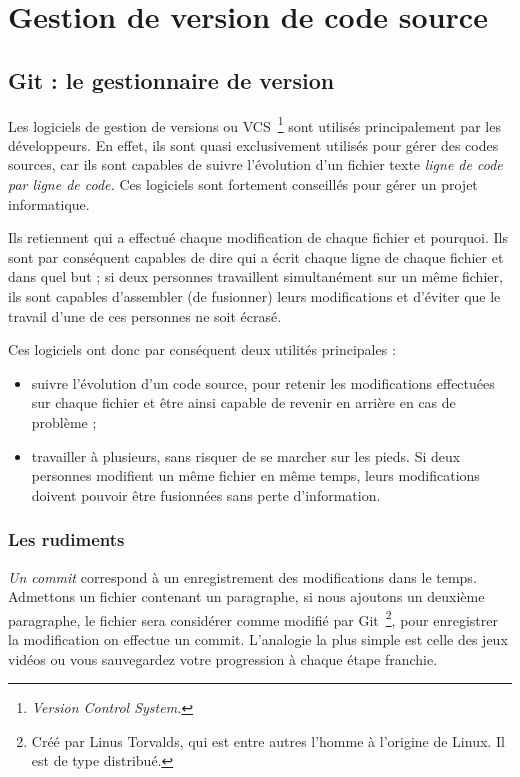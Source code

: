 \chapter{Gestion de version de code source}

\section{Git : le gestionnaire de version}

Les logiciels de gestion de versions ou VCS\, \footnote{\emph{Version Control
System.}} sont utilisés principalement par les développeurs. En effet, ils sont
quasi exclusivement utilisés pour gérer des codes sources, car ils sont
capables de suivre l’évolution d’un fichier texte \emph{ligne de code par ligne de
code.} Ces logiciels sont fortement conseillés pour gérer un projet
informatique.

Ils retiennent qui a effectué chaque modification de chaque fichier et
pourquoi. Ils sont par conséquent capables de dire qui a écrit chaque ligne de
chaque fichier et dans quel but ; si deux personnes travaillent simultanément
sur un même fichier, ils sont capables d’assembler (de fusionner) leurs
modifications et d’éviter que le travail d’une de ces personnes ne soit écrasé.

Ces logiciels ont donc par conséquent deux utilités principales :
\begin{itemize}
    \item suivre l’évolution d’un code source, pour retenir les modifications
effectuées sur chaque fichier et être ainsi capable de revenir en arrière en
cas de problème ;
    \item travailler à plusieurs, sans risquer de se marcher sur les pieds.
Si deux personnes modifient un même fichier en même temps, leurs modifications
doivent pouvoir être fusionnées sans perte d’information.
\end{itemize}

\subsection{Les rudiments}

\emph{Un commit} correspond à un enregistrement des modifications dans le
temps. Admettons un fichier contenant un paragraphe, si nous ajoutons un
deuxième paragraphe, le fichier sera considérer comme modifié par Git\,
\footnote{Créé par Linus Torvalds, qui est entre autres l’homme à l’origine de
Linux. Il est de type distribué.}, pour enregistrer la modification on effectue
un commit. L'analogie la plus simple est celle des jeux vidéos ou vous
sauvegardez votre progression à chaque étape franchie.

